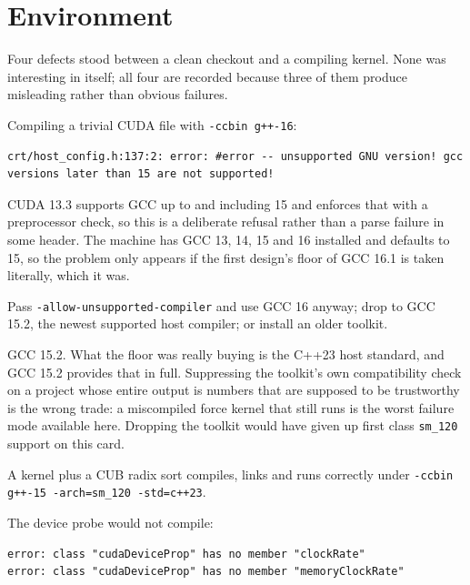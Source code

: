 \chapter{Environment}

Four defects stood between a clean checkout and a compiling kernel. None was
interesting in itself; all four are recorded because three of them produce
misleading rather than obvious failures.


 Compiling a trivial CUDA file with \texttt{-ccbin g++-16}:

\begin{lstlisting}
crt/host_config.h:137:2: error: #error -- unsupported GNU version! gcc
versions later than 15 are not supported!
\end{lstlisting}

 CUDA 13.3 supports GCC up to and including 15 and enforces
that with a preprocessor check, so this is a deliberate refusal rather than a
parse failure in some header. The machine has GCC 13, 14, 15 and 16 installed
and defaults to 15, so the problem only appears if the first design's floor of GCC
16.1 is taken literally, which it was.

 Pass \texttt{-allow-unsupported-compiler} and use GCC 16
anyway; drop to GCC 15.2, the newest supported host compiler; or install an
older toolkit.

 GCC 15.2. What the floor was really buying is the C++23
host standard, and GCC 15.2 provides that in full. Suppressing the toolkit's
own compatibility check on a project whose entire output is numbers that are
supposed to be trustworthy is the wrong trade: a miscompiled force kernel that
still runs is the worst failure mode available here. Dropping the toolkit would
have given up first class \texttt{sm\_120} support on this card.

 A kernel plus a CUB radix sort compiles, links and runs
correctly under \texttt{-ccbin g++-15 -arch=sm\_120 -std=c++23}.


 The device probe would not compile:

\begin{lstlisting}
error: class "cudaDeviceProp" has no member "clockRate"
error: class "cudaDeviceProp" has no member "memoryClockRate"
\end{lstlisting}

